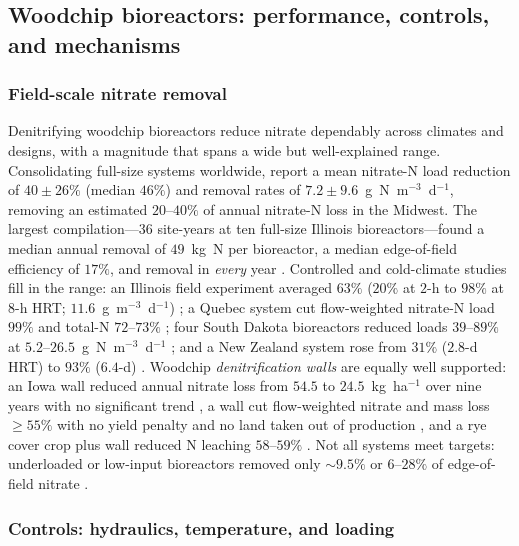 \subsection{Woodchip bioreactors: performance, controls, and mechanisms}

\subsubsection{Field-scale nitrate removal}

Denitrifying woodchip bioreactors reduce nitrate dependably across climates
and designs, with a magnitude that spans a wide but well-explained range.
Consolidating full-size systems worldwide, \textcite{Christianson2021} report
a mean nitrate-N load reduction of $40\pm26\%$ (median $46\%$) and removal
rates of $7.2\pm9.6$~g~N~m$^{-3}$~d$^{-1}$, removing an estimated $20$--$40\%$
of annual nitrate-N loss in the Midwest. The largest compilation---36
site-years at ten full-size Illinois bioreactors---found a median annual
removal of $49$~kg~N per bioreactor, a median edge-of-field efficiency of
$17\%$, and removal in \emph{every} year \parencite{Christianson2026}.
Controlled and cold-climate studies fill in the range: an Illinois field
experiment averaged $63\%$ ($20\%$ at $2$-h to $98\%$ at $8$-h HRT;
$11.6$~g~m$^{-3}$~d$^{-1}$) \parencite{Bell2015}; a Quebec system cut
flow-weighted nitrate-N load $99\%$ and total-N $72$--$73\%$
\parencite{Husk2017}; four South Dakota bioreactors reduced loads $39$--$89\%$
at $5.2$--$26.5$~g~N~m$^{-3}$~d$^{-1}$ \parencite{Thapa2023}; and a New Zealand
system rose from $31\%$ ($2.8$-d HRT) to $93\%$ ($6.4$-d)
\parencite{Rivas2020}. Woodchip \emph{denitrification walls} are equally well
supported: an Iowa wall reduced annual nitrate loss from $54.5$ to
$24.5$~kg~ha$^{-1}$ over nine years with no significant trend
\parencite{Moorman2010}, a wall cut flow-weighted nitrate and mass loss
$\geq55\%$ with no yield penalty and no land taken out of production
\parencite{Jaynes2008}, and a rye cover crop plus wall reduced N leaching
$58$--$59\%$ \parencite{Rogovska2023}. Not all systems meet targets:
underloaded or low-input bioreactors removed only $\sim9.5\%$
\parencite{Bock2018} or $6$--$28\%$ of edge-of-field nitrate \parencite{Maxwell2022}.

\subsubsection{Controls: hydraulics, temperature, and loading}

